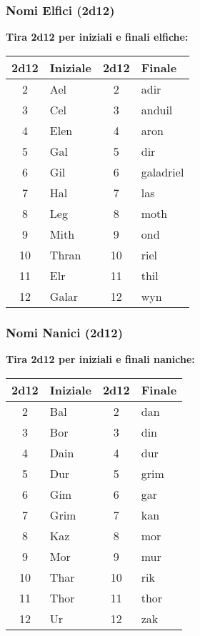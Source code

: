 \begin{multicols}{2}
{\subsubsection*{Nomi Elfici (2d12)}
\textbf{Tira 2d12 per iniziali e finali elfiche:}

\noindent\begin{tabular}{|c|l||c|l|}
\toprule
\textbf{2d12} & \textbf{Iniziale} & \textbf{2d12} & \textbf{Finale} \\
\midrule
2 & Ael & 2 & adir \\
3 & Cel & 3 & anduil \\
4 & Elen & 4 & aron \\
5 & Gal & 5 & dir \\
6 & Gil & 6 & galadriel \\
7 & Hal & 7 & las \\
8 & Leg & 8 & moth \\
9 & Mith & 9 & ond \\
10 & Thran & 10 & riel \\
11 & Elr & 11 & thil \\
12 & Galar & 12 & wyn \\
\bottomrule
\end{tabular}


\subsubsection*{Nomi Nanici (2d12)}
\textbf{Tira 2d12 per iniziali e finali naniche:}

\noindent\begin{tabular}{|c|l||c|l|}
\toprule
\textbf{2d12} & \textbf{Iniziale} & \textbf{2d12} & \textbf{Finale} \\
\midrule
2 & Bal & 2 & dan \\
3 & Bor & 3 & din \\
4 & Dain & 4 & dur \\
5 & Dur & 5 & grim \\
6 & Gim & 6 & gar \\
7 & Grim & 7 & kan \\
8 & Kaz & 8 & mor \\
9 & Mor & 9 & mur \\
10 & Thar & 10 & rik \\
11 & Thor & 11 & thor \\
12 & Ur & 12 & zak \\
\bottomrule
\end{tabular}



}
\end{multicols}
